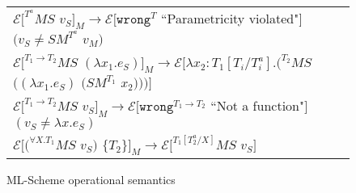 \begin{figure}[p]
\begin{tabular}{l}
\vspace{5pt}

$\mathscr{E}[^{T^{a}}MS$ $v_{S}]_{M}\rightarrow\mathscr{E}[\mathtt{wrong}^{T}$ ``Parametricity violated"$]$ $(v_{S}\neq SM^{T^{a}}$ $v_{M})$ \\

\vspace{5pt}

$\mathscr{E}[^{T_{1}\rightarrow T_{2}}MS$ $(\lambda x_{1}.e_{S})]_{M}\rightarrow\mathscr{E}[\lambda x_{2}:T_{1}[T_{i}/T^{a}_{i}].(^{T_{2}}MS$ $((\lambda x_{1}.e_{S})$ $(SM^{T_{1}}$ $x_{2})))]$ \\

\vspace{5pt}

$\mathscr{E}[^{T_{1}\rightarrow T_{2}}MS$ $v_{S}]_{M}\rightarrow\mathscr{E}[\mathtt{wrong}^{T_{1}\rightarrow T_{2}}$ ``Not a function"$]$ $(v_{S}\neq\lambda x.e_{S})$ \\

\vspace{5pt}

$\mathscr{E}[(^{\forall X.T_{1}}MS$ $v_{S})$ $\lbrace T_{2}\rbrace]_{M}\rightarrow\mathscr{E}[^{T_{1}[T^{a}_{2}/X]}MS$ $v_{S}]$
\end{tabular}
\caption{ML-Scheme operational semantics}
\label{msos}
\end{figure}